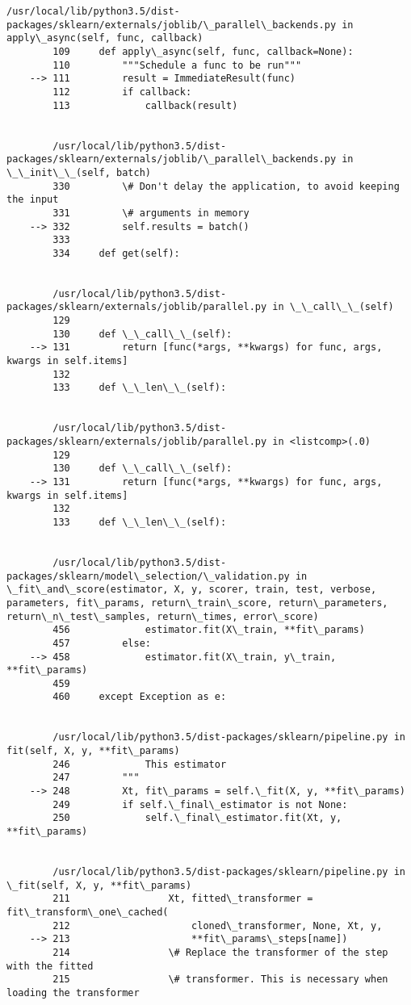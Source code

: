 \documentclass[11pt]{article}
\begin{document}
\begin{Verbatim}[commandchars=\\\{\}]
        /usr/local/lib/python3.5/dist-packages/sklearn/externals/joblib/\_parallel\_backends.py in apply\_async(self, func, callback)
        109     def apply\_async(self, func, callback=None):
        110         """Schedule a func to be run"""
    --> 111         result = ImmediateResult(func)
        112         if callback:
        113             callback(result)


        /usr/local/lib/python3.5/dist-packages/sklearn/externals/joblib/\_parallel\_backends.py in \_\_init\_\_(self, batch)
        330         \# Don't delay the application, to avoid keeping the input
        331         \# arguments in memory
    --> 332         self.results = batch()
        333 
        334     def get(self):


        /usr/local/lib/python3.5/dist-packages/sklearn/externals/joblib/parallel.py in \_\_call\_\_(self)
        129 
        130     def \_\_call\_\_(self):
    --> 131         return [func(*args, **kwargs) for func, args, kwargs in self.items]
        132 
        133     def \_\_len\_\_(self):


        /usr/local/lib/python3.5/dist-packages/sklearn/externals/joblib/parallel.py in <listcomp>(.0)
        129 
        130     def \_\_call\_\_(self):
    --> 131         return [func(*args, **kwargs) for func, args, kwargs in self.items]
        132 
        133     def \_\_len\_\_(self):


        /usr/local/lib/python3.5/dist-packages/sklearn/model\_selection/\_validation.py in \_fit\_and\_score(estimator, X, y, scorer, train, test, verbose, parameters, fit\_params, return\_train\_score, return\_parameters, return\_n\_test\_samples, return\_times, error\_score)
        456             estimator.fit(X\_train, **fit\_params)
        457         else:
    --> 458             estimator.fit(X\_train, y\_train, **fit\_params)
        459 
        460     except Exception as e:


        /usr/local/lib/python3.5/dist-packages/sklearn/pipeline.py in fit(self, X, y, **fit\_params)
        246             This estimator
        247         """
    --> 248         Xt, fit\_params = self.\_fit(X, y, **fit\_params)
        249         if self.\_final\_estimator is not None:
        250             self.\_final\_estimator.fit(Xt, y, **fit\_params)


        /usr/local/lib/python3.5/dist-packages/sklearn/pipeline.py in \_fit(self, X, y, **fit\_params)
        211                 Xt, fitted\_transformer = fit\_transform\_one\_cached(
        212                     cloned\_transformer, None, Xt, y,
    --> 213                     **fit\_params\_steps[name])
        214                 \# Replace the transformer of the step with the fitted
        215                 \# transformer. This is necessary when loading the transformer



\end{Verbatim}
\end{document}
